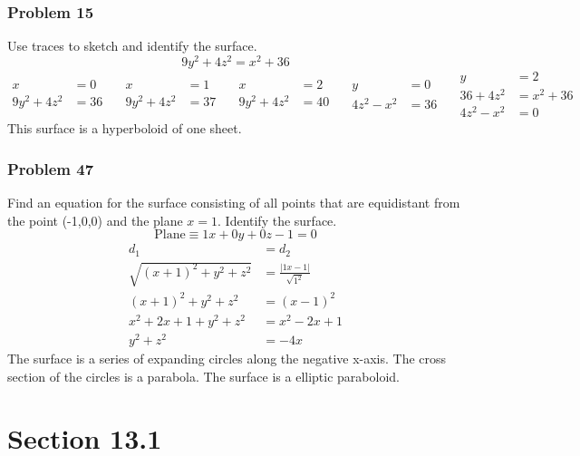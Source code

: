 \documentclass[letterpaper, 12pt]{math}
\begin{document}
\subsubsection*{Problem 15}
Use traces to sketch and identify the surface.
\[ 9y^2+4z^2 = x^2+36 \]
\[\begin{split}
  x &= 0 \\
  9y^2+4z^2 &= 36
\end{split}\quad
\begin{split}
  x &= 1 \\
  9y^2+4z^2 &= 37
\end{split}\quad
\begin{split}
  x &= 2 \\
  9y^2+4z^2 &= 40
\end{split}\quad
\begin{split}
  y &= 0 \\
  4z^2-x^2 &= 36
\end{split}\quad
\begin{split}
  y &= 2 \\
  36+4z^2 &= x^2+36 \\
  4z^2-x^2 &= 0
\end{split} \]
This surface is a hyperboloid of one sheet.

\subsubsection*{Problem 47}
Find an equation for the surface consisting of all points that are
equidistant from the point (-1,0,0) and the plane \( x = 1 \). Identify the
surface.
\[ \text{Plane} \equiv 1x+0y+0z-1 = 0 \]
\begin{align*}
  d_1 &= d_2 \\
  \sqrt{(x+1)^2+y^2+z^2} &= \frac{|1x-1|}{\sqrt{1^2}} \\
  (x+1)^2+y^2+z^2 &= (x-1)^2 \\
  x^2+2x+1+y^2+z^2 &= x^2-2x+1 \\
  y^2+z^2 &= -4x
\end{align*}
The surface is a series of expanding circles along the negative x-axis. The
cross section of the circles is a parabola. The surface is a elliptic
paraboloid.

\section*{Section 13.1}
\end{document}
